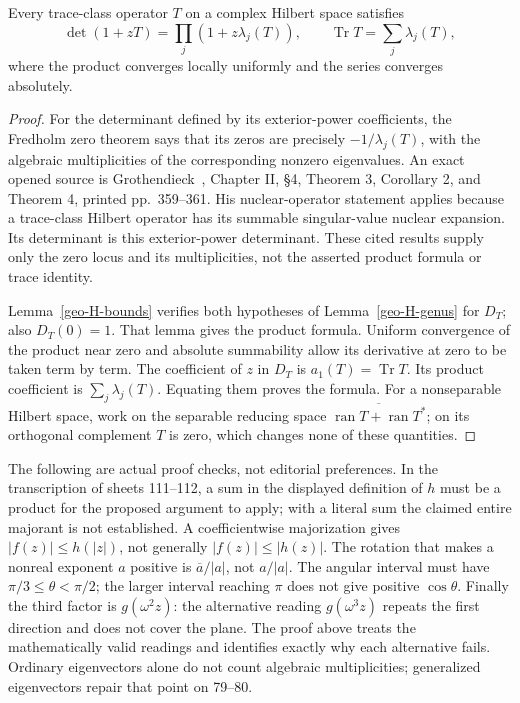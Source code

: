 \begin{theorem}
\label{geo-H-lidskii}
Every trace-class operator $T$ on a complex Hilbert space satisfies
\[
 \det(1+zT)=\prod_j(1+z\lambda_j(T)),\qquad
 \operatorname{Tr}T=\sum_j\lambda_j(T),
\]
where the product converges locally uniformly and the series converges
absolutely.
\end{theorem}
\begin{proof}
For the determinant defined by its exterior-power coefficients, the Fredholm
zero theorem says that its zeros are precisely $-1/\lambda_j(T)$, with the
algebraic multiplicities of the corresponding nonzero eigenvalues. An exact
opened source is Grothendieck~\cite{Grothendieck1956Fredholm}, Chapter II,
\S4, Theorem 3, Corollary 2, and Theorem 4, printed pp.~359--361. His
nuclear-operator statement applies because a trace-class Hilbert operator
has its summable singular-value nuclear expansion. Its determinant is this
exterior-power determinant. These cited results supply only the zero locus
and its multiplicities, not the asserted product formula or trace identity.

Lemma~\ref{geo-H-bounds} verifies both hypotheses of
Lemma~\ref{geo-H-genus} for $D_T$; also $D_T(0)=1$. That lemma gives the
product formula. Uniform convergence of the product near zero and absolute
summability allow its derivative at zero to be taken term by term. The
coefficient of $z$ in $D_T$ is $a_1(T)=\operatorname{Tr}T$. Its product
coefficient is $\sum_j\lambda_j(T)$. Equating them proves the formula.
For a nonseparable Hilbert space, work on the separable reducing space
$\overline{\operatorname{ran}T+\operatorname{ran}T^*}$; on its orthogonal
complement $T$ is zero, which changes none of these quantities.
\end{proof}

The following are actual proof checks, not editorial preferences. In the
transcription of sheets 111--112, a sum in the displayed definition of $h$
must be a product for the proposed argument to apply; with a literal sum the
claimed entire majorant is not established. A coefficientwise majorization
gives $|f(z)|\leq h(|z|)$, not generally $|f(z)|\leq|h(z)|$. The rotation
that makes a nonreal exponent $a$ positive is $\overline a/|a|$, not
$a/|a|$. The angular interval must have $\pi/3\leq\theta<\pi/2$; the
larger interval reaching $\pi$ does not give positive $\cos\theta$.
Finally the third factor is $g(\omega^2z)$: the alternative reading
$g(\omega^3z)$ repeats the first direction and does not cover the plane.
The proof above treats the mathematically valid readings and identifies
exactly why each alternative fails. Ordinary eigenvectors alone do not count
algebraic multiplicities; generalized eigenvectors repair that point on
79--80.

